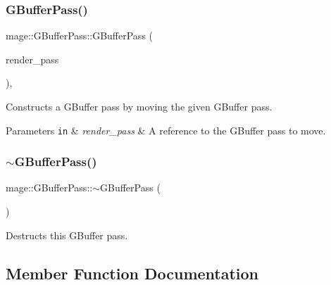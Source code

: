 \subsubsection{\texorpdfstring{G\+Buffer\+Pass()}{GBufferPass()}\hspace{0.1cm}{\footnotesize\ttfamily [3/3]}}
{\footnotesize\ttfamily mage\+::\+G\+Buffer\+Pass\+::\+G\+Buffer\+Pass (\begin{DoxyParamCaption}\item[{\hyperlink{classmage_1_1_g_buffer_pass}{G\+Buffer\+Pass} \&\&}]{render\+\_\+pass }\end{DoxyParamCaption})\hspace{0.3cm}{\ttfamily [default]}, {\ttfamily [noexcept]}}

Constructs a G\+Buffer pass by moving the given G\+Buffer pass.


\begin{DoxyParams}[1]{Parameters}
\mbox{\tt in}  & {\em render\+\_\+pass} & A reference to the G\+Buffer pass to move. \\
\hline
\end{DoxyParams}
\hypertarget{classmage_1_1_g_buffer_pass_a34b2735cfb9b3546c903760f42ff770c}{}\label{classmage_1_1_g_buffer_pass_a34b2735cfb9b3546c903760f42ff770c} 
\subsubsection{\texorpdfstring{$\sim$\+G\+Buffer\+Pass()}{~GBufferPass()}}
{\footnotesize\ttfamily mage\+::\+G\+Buffer\+Pass\+::$\sim$\+G\+Buffer\+Pass (\begin{DoxyParamCaption}{ }\end{DoxyParamCaption})\hspace{0.3cm}{\ttfamily [default]}}

Destructs this G\+Buffer pass. 

\subsection{Member Function Documentation}
\hypertarget{classmage_1_1_g_buffer_pass_a4a13364cc0318417f31df50d7081b0b0}{}\label{classmage_1_1_g_buffer_pass_a4a13364cc0318417f31df50d7081b0b0} 
